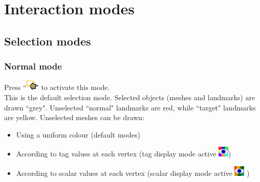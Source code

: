 \chapter{Interaction modes}
\minitoc  

 \section{Selection modes}
 \subsection{Normal mode}
Press ``\includegraphics[scale=0.7]{images/pixmap/Normal_select_mode.png}" to activate this mode.\\
This is the default selection mode. Selected objects (meshes and landmarks) are drawn ``grey". Unselected ``normal" landmarks are red, while ``target" landmarks are yellow. Unselected meshes can be drawn:
\begin{itemize}
\item Using a uniform colour (default modes)
\item According to tag values at each vertex (tag display mode active \includegraphics[scale=0.7]{images/pixmap/Show_Tag_Window.png})
\item	According to scalar values at each vertex (scalar display mode active \includegraphics[scale=0.7]{images/pixmap/show_color_scale.png} )
\end{itemize}



